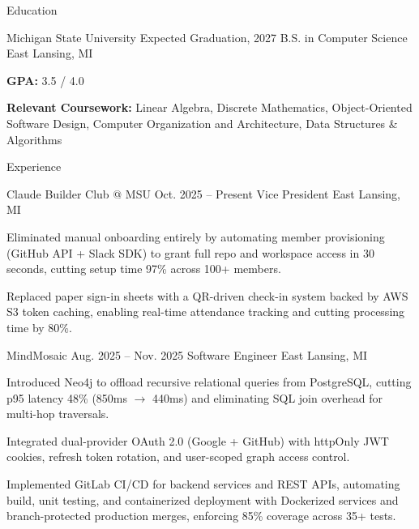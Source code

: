 \documentclass[
	11pt
]{../../../resume}
\begin{document}
	\begin{rSection}{E}{ducation}
		\begin{rSectionEntry}
			{Michigan State University}
			{Expected Graduation, 2027}
			{B.S. in Computer Science}
			{}
			{East Lansing, MI}

			\item \textbf{GPA:} 3.5 / 4.0
			\item \textbf{Relevant Coursework:} Linear Algebra, Discrete Mathematics, Object-Oriented Software Design, Computer Organization and Architecture, Data Structures \& Algorithms
		\end{rSectionEntry}
	\end{rSection}

	\begin{rSection}{E}{xperience}
		\begin{rSectionEntry}
			{Claude Builder Club @ MSU}
			{Oct. 2025 -- Present}
			{Vice President}
			{}
			{East Lansing, MI}

			\item Eliminated manual onboarding entirely by automating member provisioning (GitHub API + Slack SDK) to grant full repo and workspace access in 30 seconds, cutting setup time 97\% across 100+ members.
			\item Replaced paper sign-in sheets with a QR-driven check-in system backed by AWS S3 token caching, enabling real-time attendance tracking and cutting processing time by 80\%.
		\end{rSectionEntry}

		\begin{rSectionEntry}
			{MindMosaic}
			{Aug. 2025 -- Nov. 2025}
			{Software Engineer}
			{}
			{East Lansing, MI}

			\item Introduced Neo4j to offload recursive relational queries from PostgreSQL, cutting p95 latency 48\% (850ms $\rightarrow$ 440ms) and eliminating SQL join overhead for multi-hop traversals.
			\item Integrated dual-provider OAuth 2.0 (Google + GitHub) with httpOnly JWT cookies, refresh token rotation, and user-scoped graph access control.
			\item Implemented GitLab CI/CD for backend services and REST APIs, automating build, unit testing, and containerized deployment with Dockerized services and branch-protected production merges, enforcing 85\% coverage across 35+ tests.
		\end{rSectionEntry}
	\end{rSection}
\end{document}
